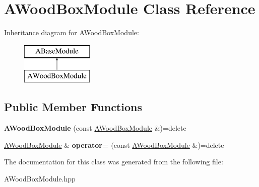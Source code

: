 \hypertarget{class_a_wood_box_module}{}\section{A\+Wood\+Box\+Module Class Reference}
\label{class_a_wood_box_module}
Inheritance diagram for A\+Wood\+Box\+Module\+:\begin{figure}[H]
\begin{center}
\leavevmode
\includegraphics[height=2.000000cm]{class_a_wood_box_module}
\end{center}
\end{figure}
\subsection*{Public Member Functions}
\begin{DoxyCompactItemize}
\item 
\mbox{\label{class_a_wood_box_module_a62117d5110f14e7d681153ae678745ad}} 
{\bfseries A\+Wood\+Box\+Module} (const \mbox{\hyperlink{class_a_wood_box_module}{A\+Wood\+Box\+Module}} \&)=delete
\item 
\mbox{\label{class_a_wood_box_module_a26a9fa3a23c612085433f58c94e1c70c}} 
\mbox{\hyperlink{class_a_wood_box_module}{A\+Wood\+Box\+Module}} \& {\bfseries operator=} (const \mbox{\hyperlink{class_a_wood_box_module}{A\+Wood\+Box\+Module}} \&)=delete
\end{DoxyCompactItemize}


The documentation for this class was generated from the following file\+:\begin{DoxyCompactItemize}
\item 
A\+Wood\+Box\+Module.\+hpp\end{DoxyCompactItemize}
